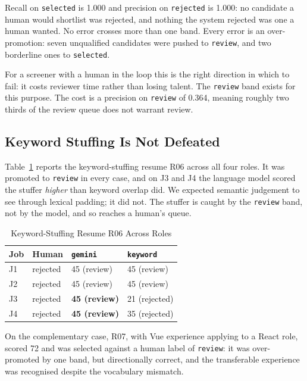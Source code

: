 \documentclass[conference]{IEEEtran}
\begin{document}
Recall on \texttt{selected} is 1.000 and precision on \texttt{rejected} is
1.000: no candidate a human would shortlist was rejected, and nothing the system
rejected was one a human wanted. No error crosses more than one band. Every
error is an over-promotion: seven unqualified candidates were pushed to
\texttt{review}, and two borderline ones to \texttt{selected}.

For a screener with a human in the loop this is the right direction in which to
fail: it costs reviewer time rather than losing talent. The \texttt{review} band
exists for this purpose. The cost is a precision on \texttt{review} of 0.364,
meaning roughly two thirds of the review queue does not warrant review.

\subsection{Keyword Stuffing Is Not Defeated}
\label{sec:stuffing}

Table~\ref{tab:stuffer} reports the keyword-stuffing resume R06 across all four
roles. It was promoted to \texttt{review} in every case, and on J3 and J4 the
language model scored the stuffer \textit{higher} than keyword overlap did. We
expected semantic judgement to see through lexical padding; it did not. The
stuffer is caught by the \texttt{review} band, not by the model, and so reaches
a human's queue.

\begin{table}[!t]
\caption{Keyword-Stuffing Resume R06 Across Roles}
\label{tab:stuffer}
\begin{center}
\begin{tabular}{|l|l|l|l|}
\hline
\textbf{Job} & \textbf{Human} & \textbf{\texttt{gemini}} & \textbf{\texttt{keyword}} \\
\hline
J1 & rejected & 45 (review) & 45 (review) \\
\hline
J2 & rejected & 45 (review) & 45 (review) \\
\hline
J3 & rejected & \textbf{45 (review)} & 21 (rejected) \\
\hline
J4 & rejected & \textbf{45 (review)} & 35 (rejected) \\
\hline
\end{tabular}
\end{center}
\end{table}

On the complementary case, R07, with Vue experience applying to a React role,
scored 72 and was selected against a human label of \texttt{review}: it was
over-promoted by one band, but directionally correct, and the transferable
experience was recognised despite the vocabulary mismatch.
\end{document}
